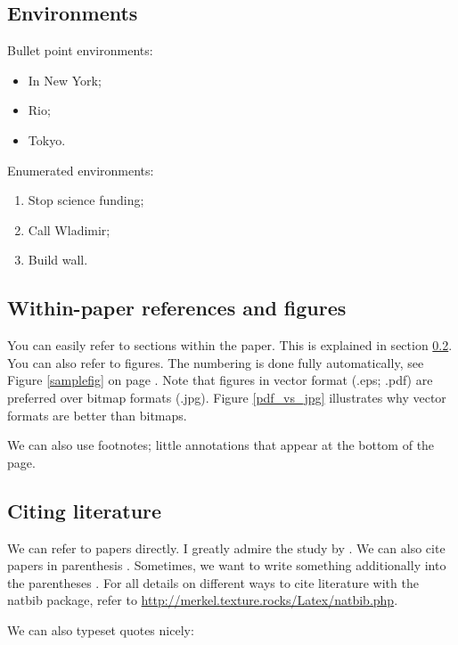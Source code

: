 \subsection{Environments}

Bullet point environments:
\begin{itemize}
\item In New York;
\item Rio;
\item Tokyo.
\end{itemize}

Enumerated environments:
\begin{enumerate}
\item Stop science funding;
\item Call Wladimir;
\item Build wall.
\end{enumerate}


\subsection{Within-paper references and figures}
\label{withpaperrefs}

You can easily refer to sections within the paper. This is explained in section \ref{withpaperrefs}. You can also refer to figures. The numbering is done fully automatically, see Figure \ref{samplefig} on page \pageref{samplefig}. Note that figures in vector format (.eps; .pdf) are preferred over bitmap formats (.jpg). Figure \ref{pdf_vs_jpg} illustrates why vector formats are better than bitmaps.

We can also use footnotes; little annotations that appear at the bottom of the page\footnotemark.



\subsection{Citing literature}


We can refer to papers directly. I greatly admire the study by \cite{ADRIAN1934}. We can also cite papers in parenthesis \citep{ADRIAN1934}. Sometimes, we want to write something additionally into the parentheses \citep[the study by][is also not bad]{Allard2011}. For all details on different ways to cite literature with the natbib package, refer to \url{http://merkel.texture.rocks/Latex/natbib.php}. 

We can also typeset quotes nicely:

